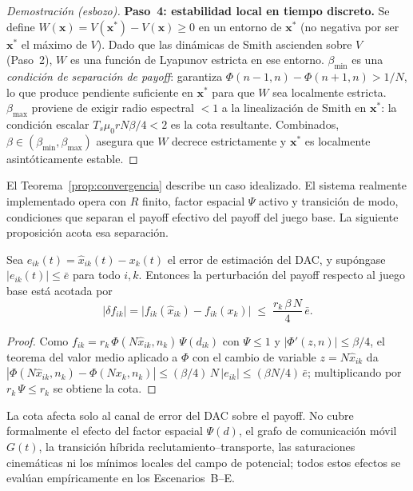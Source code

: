 \begin{proof}[Demostración (esbozo)]
\textbf{Paso~4: estabilidad local en tiempo discreto.}
Se define $W(\mathbf{x}) = V(\mathbf{x}^*) - V(\mathbf{x}) \geq 0$ en un entorno
de $\mathbf{x}^*$ (no negativa por ser $\mathbf{x}^*$ el máximo de $V$).
Dado que las dinámicas de Smith ascienden sobre $V$ (Paso~2), $W$ es una
función de Lyapunov estricta en ese entorno.
$\beta_{\min}$ es una \emph{condición de separación de payoff}: garantiza
$\Phi(n{-}1,n)-\Phi(n{+}1,n) > 1/N$, lo que produce pendiente suficiente en $\mathbf{x}^*$
para que $W$ sea localmente estricta.
$\beta_{\max}$ proviene de exigir radio espectral $< 1$ a la linealización de Smith
en $\mathbf{x}^*$: la condición escalar $T_s\mu_0 r N\beta/4 < 2$ es la cota resultante.
Combinados, $\beta \in (\beta_{\min},\beta_{\max})$ asegura que $W$ decrece estrictamente
y $\mathbf{x}^*$ es localmente asintóticamente estable.
\end{proof}

El Teorema~\ref{prop:convergencia} describe un caso idealizado. El sistema
realmente implementado opera con $R$ finito, factor espacial $\Psi$ activo y
transición de modo, condiciones que separan el payoff efectivo del payoff del juego
base. La siguiente proposición acota esa separación.

\begin{proposicion}
\label{prop:perturbacion}
Sea $e_{ik}(t) = \hat{x}_{ik}(t) - x_k(t)$ el error de estimación del DAC, y
supóngase $|e_{ik}(t)| \leq \bar{e}$ para todo $i,k$. Entonces la perturbación del
payoff respecto al juego base está acotada por
\[
  |\delta f_{ik}| = \bigl|f_{ik}(\hat{x}_{ik}) - f_{ik}(x_k)\bigr|
    \;\leq\; \frac{r_k\,\beta\,N}{4}\,\bar{e}.
\]
\end{proposicion}
\begin{proof}
Como $f_{ik} = r_k\,\Phi(N\hat{x}_{ik},n_k)\,\Psi(d_{ik})$ con $\Psi \leq 1$ y
$|\Phi'(z,n)| \leq \beta/4$, el teorema del valor medio aplicado a $\Phi$ con el
cambio de variable $z = N\hat{x}_{ik}$ da
$|\Phi(N\hat{x}_{ik},n_k) - \Phi(Nx_k,n_k)| \leq (\beta/4)\,N\,|e_{ik}|
\leq (\beta N/4)\,\bar{e}$; multiplicando por $r_k\,\Psi \leq r_k$ se obtiene la cota.
\end{proof}

La cota afecta solo al canal de error del DAC sobre el payoff. No cubre
formalmente el efecto del factor espacial $\Psi(d)$, el grafo de comunicación móvil
$G(t)$, la transición híbrida reclutamiento--transporte, las saturaciones cinemáticas
ni los mínimos locales del campo de potencial; todos estos efectos se evalúan
empíricamente en los Escenarios~B--E.

